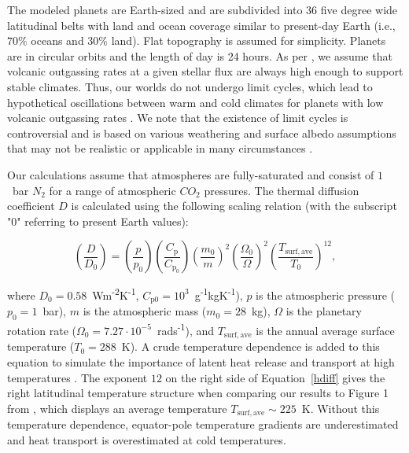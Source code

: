 \documentclass[fleqn,usenatbib]{mnras}
\begin{document}
The modeled planets are Earth-sized and are subdivided into 36 five degree wide latitudinal belts with land and ocean coverage similar to present-day Earth (i.e., $70 \%$ oceans and $30 \%$ land). Flat topography is assumed for simplicity. Planets are in circular orbits and the length of day is 24 hours. As per \citet{Turbet2017}, we assume that volcanic outgassing rates at a given stellar flux are always high enough to support stable climates. Thus, our worlds do not undergo limit cycles, which lead to hypothetical oscillations between warm and cold climates for planets with low volcanic outgassing rates \citep{haqq2016limit,paradise2017,kadoya_outer_2019}. We note that the existence of limit cycles is controversial and is based on various weathering and surface albedo assumptions that may not be realistic or applicable in many circumstances \citep{ramirez2017mars,graham-a}.

Our calculations assume that atmospheres are fully-saturated and consist of $1$~bar $N_{\mathrm{2}}$ for a range of atmospheric $CO_{\mathrm{2}}$ pressures. The thermal diffusion coefficient $D$ is calculated using the following scaling relation (with the subscript "$0$" referring to present Earth values):

\begin{equation}
\label{hdiff}
    \left(\frac{D}{D_{\mathrm{0}}}\right)=\left(\frac{p}{p_{\mathrm{0}}}\right)\left(\frac{C_{\mathrm{p}}}{C_{\mathrm{p}_{0}}}\right)\left(\frac{m_{\mathrm{0}}}{m}\right)^{2}\left(\frac{\Omega_{0}}{\Omega}\right)^{2}\left(\frac{T_{\mathrm{surf,ave}}}{T_{\mathrm{0}}}\right)^{12},
\end{equation}

where $D_{\mathrm{0}}=0.58$~Wm\textsuperscript{-2}K\textsuperscript{-1}, $C_{\mathrm{p0}}=10^{3}$~g\textsuperscript{-1}kgK\textsuperscript{-1}), $p$ is the atmospheric pressure ($p_{\mathrm{0}}=1$~bar), $m$ is the atmospheric mass ($m_{\mathrm{0}}=28$~kg), $\Omega$ is the planetary rotation rate ($\Omega_{\mathrm{0}}=7.27 \cdot 10^{\mathrm{-5}}$~rads\textsuperscript{-1}), and $T_{\mathrm{surf,ave}}$ is the annual average surface temperature ($T_{\mathrm{0}}=288$~K). A crude temperature dependence is added to this equation to simulate the importance of latent heat release and transport at high temperatures \citep{Caballero2005a,Rose2017}. The exponent $12$ on the right side of Equation~\ref{hdiff} gives the right latitudinal temperature structure when comparing our results to Figure 1 from \citet{Turbet2017}, which displays an average temperature $T_{\mathrm{surf,ave}} \sim 225$~K. Without this temperature dependence, equator-pole temperature gradients are underestimated and heat transport is overestimated at cold temperatures.
\end{document}
